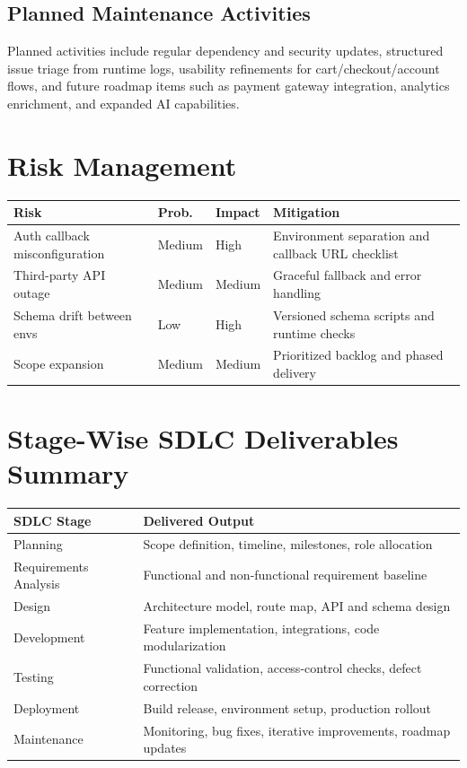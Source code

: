 \documentclass[12pt,a4paper]{article}
\begin{document}
\subsection{Planned Maintenance Activities}
Planned activities include regular dependency and security updates, structured issue triage from runtime logs, usability refinements for cart/checkout/account flows, and future roadmap items such as payment gateway integration, analytics enrichment, and expanded AI capabilities.

\section{Risk Management}
\begin{tabular}{p{} p{} p{} p{}}
\toprule
\textbf{Risk} & \textbf{Prob.} & \textbf{Impact} & \textbf{Mitigation} \\
\midrule
Auth callback misconfiguration & Medium & High & Environment separation and callback URL checklist \\
Third-party API outage & Medium & Medium & Graceful fallback and error handling \\
Schema drift between envs & Low & High & Versioned schema scripts and runtime checks \\
Scope expansion & Medium & Medium & Prioritized backlog and phased delivery \\
\bottomrule
\end{tabular}

\section{Stage-Wise SDLC Deliverables Summary}
\begin{longtable}{p{} p{}}
\toprule
\textbf{SDLC Stage} & \textbf{Delivered Output} \\
\midrule
Planning & Scope definition, timeline, milestones, role allocation \\
Requirements Analysis & Functional and non-functional requirement baseline \\
Design & Architecture model, route map, API and schema design \\
Development & Feature implementation, integrations, code modularization \\
Testing & Functional validation, access-control checks, defect correction \\
Deployment & Build release, environment setup, production rollout \\
Maintenance & Monitoring, bug fixes, iterative improvements, roadmap updates \\
\bottomrule
\end{longtable}
\end{document}
